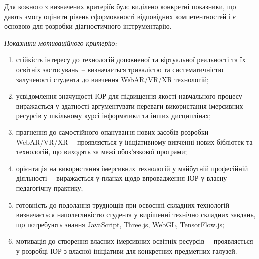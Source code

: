 Для кожного з визначених критеріїв було виділено конкретні показники, що дають змогу оцінити рівень сформованості відповідних компетентностей і є основою для розробки діагностичного інструментарію.

\textit{Показники мотиваційного критерію:}
\begin{enumerate}
\item стійкість інтересу до технологій доповненої та віртуальної реальності та їх освітніх застосувань~-- визначається тривалістю та систематичністю залученості студента до вивчення WebAR/VR/XR технологій;
\item усвідомлення значущості ІОР для підвищення якості навчального процесу~-- виражається у здатності аргументувати переваги використання імерсивних ресурсів у шкільному курсі інформатики та інших дисциплінах;
\item прагнення до самостійного опанування нових засобів розробки WebAR/VR/XR~-- проявляється у ініціативному вивченні нових бібліотек та технологій, що виходять за межі обов'язкової програми;
\item орієнтація на використання імерсивних технологій у майбутній професійній діяльності~-- виражається у планах щодо впровадження ІОР у власну педагогічну практику;
\item готовність до подолання труднощів при освоєнні складних технологій~-- визначається наполегливістю студента у вирішенні технічно складних завдань, що потребують знання JavaScript, Three.js, WebGL, TensorFlow.js;
\item мотивація до створення власних імерсивних освітніх ресурсів~-- проявляється у розробці ІОР з власної ініціативи для конкретних предметних галузей.
\end{enumerate}

